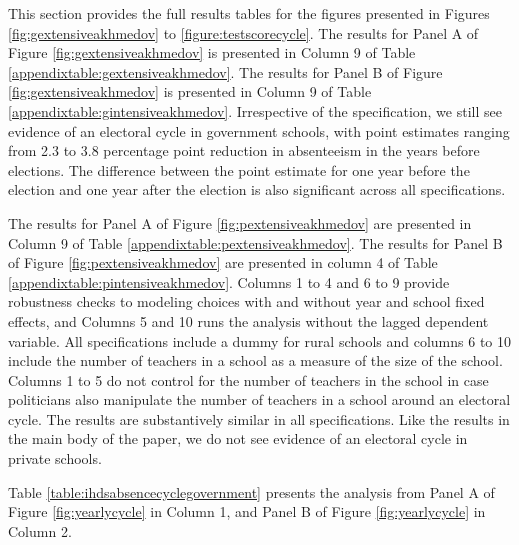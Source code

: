 \documentclass[hidelinks, 12pt, article, oneside]{memoir}
\begin{document}
This section provides the full results tables for the figures presented in Figures \ref{fig:gextensiveakhmedov} to \ref{figure:testscorecycle}.  The results for Panel A of Figure \ref{fig:gextensiveakhmedov} is presented in Column 9 of Table \ref{appendixtable:gextensiveakhmedov}.  The results for Panel B of Figure \ref{fig:gextensiveakhmedov} is presented in Column 9 of Table \ref{appendixtable:gintensiveakhmedov}.  Irrespective of the specification, we still see evidence of an electoral cycle in government schools, with point estimates ranging from 2.3 to 3.8 percentage point reduction in absenteeism in the years before elections.  The difference between the point estimate for one year before the election and one year after the election is also significant across all specifications.

\SingleSpacing




\DoubleSpacing

The results for Panel A of Figure \ref{fig:pextensiveakhmedov} are presented in Column 9 of Table \ref{appendixtable:pextensiveakhmedov}. The results for Panel B of Figure \ref{fig:pextensiveakhmedov} are presented in column 4 of Table \ref{appendixtable:pintensiveakhmedov}.  Columns 1 to 4 and 6 to 9 provide robustness checks to modeling choices with and without year and school fixed effects, and Columns 5 and 10 runs the analysis without the lagged dependent variable.  All specifications include a dummy for rural schools and columns 6 to 10 include the number of teachers in a school as a measure of the size of the school.  Columns 1 to 5 do not control for the number of teachers in the school in case politicians also manipulate the number of teachers in a school around an electoral cycle.  The results are substantively similar in all specifications.  Like the results in the main body of the paper, we do not see evidence of an electoral cycle in private schools.

\SingleSpacing



\DoubleSpacing

Table \ref{table:ihdsabsencecyclegovernment} presents the analysis from Panel A of Figure \ref{fig:yearlycycle} in Column 1, and Panel B of Figure \ref{fig:yearlycycle} in Column 2.

\SingleSpacing

\DoubleSpacing
\end{document}
